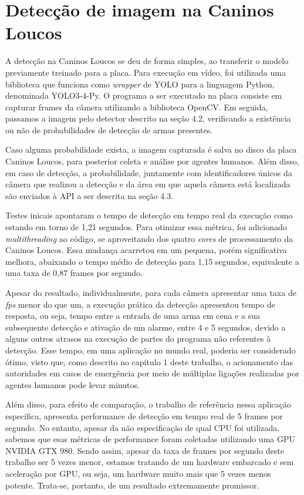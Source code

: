\documentclass[]{politex}
\begin{document}
\section{Detecção de imagem na Caninos Loucos}

A detecção na Caninos Loucos se deu de forma simples, ao transferir o modelo previamente treinado para a placa. Para execução em vídeo, foi utilizada uma biblioteca que funciona como \textit{wrapper} de YOLO para a linguagem Python, denominada YOLO3-4-Py. O programa a ser executado na placa consiste em capturar frames da câmera utilizando a biblioteca OpenCV. Em seguida, passamos a imagem pelo detector descrito na seção 4.2, verificando a existência ou não de probabilidades de detecção de armas presentes.

Caso alguma probabilidade exista, a imagem capturada é salva no disco da placa Caninos Loucos, para posterior coleta e análise por agentes humanos. Além disso, em caso de detecção, a probabilidade, juntamente com identificadores únicos da câmera que realizou a detecção e da área em que aquela câmera está localizada são enviados à API a ser descrita na seção 4.3.

Testes inicais apontaram o tempo de detecção em tempo real da execução como estando em torno de 1,21 segundos. Para otimizar essa métrica, foi adicionado \textit{multithreading} ao código, se aproveitando dos quatro \textit{cores} de processamento da Caninos Loucos. Essa mudança acarretou em um pequena, porém significativa melhora, abaixando o tempo médio de detecção para 1,15 segundos, equivalente a uma taxa de 0,87 frames por segundo.

Apesar do resultado, individualmente, para cada câmera apresentar uma taxa de \textit{fps} menor do que um, a execução prática da detecção apresentou tempo de resposta, ou seja, tempo entre a entrada de uma arma em cena e a sua subsequente detecção e ativação de um alarme, entre 4 e 5 segundos, devido a alguns outros atrasos na execução de partes do programa não referentes à detecção. Esse tempo, em uma aplicação no mundo real, poderia ser considerado ótimo, visto que, como descrito no capítulo 1 deste trabalho, o acionamento das autoridades em casos de emergência por meio de múltiplas ligações realizadas por agentes humanos pode levar minutos.

Além disso, para efeito de comparação, o trabalho de referência nessa aplicação específica, \citeyear{olmos1} \citeauthor{olmos1} apresenta performance de detecção em tempo real de 5 frames por segundo. No entanto, apesar da não especificação de qual CPU foi utilizada, sabemos que esas métricas de performance foram coletadas utilizando uma GPU NVIDIA GTX 980. Sendo assim, apesar da taxa de frames por segundo deste trabalho ser 5 vezes menor, estamos tratando de um hardware embarcado e sem aceleração por GPU, ou seja, um hardware muito mais que 5 vezes menos potente. Trata-se, portanto, de um resultado extremamente promissor.
\end{document}
